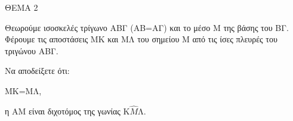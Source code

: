 
ΘΕΜΑ 2

Θεωρούμε ισοσκελές τρίγωνο ΑΒΓ (ΑΒ=ΑΓ) και το μέσο Μ της βάσης του ΒΓ. Φέρουμε τις αποστάσεις ΜΚ και ΜΛ του σημείου Μ από τις ίσες πλευρές του τριγώνου ΑΒΓ.

Να αποδείξετε ότι:

\begin{alist}
\item ΜΚ=ΜΛ, 

\item η ΑΜ είναι διχοτόμος της γωνίας Κ$\widehat{Μ}$Λ. 
\end{alist}
